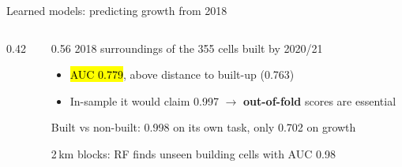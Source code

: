 \documentclass[aspectratio=169,11pt,t]{beamer}
\begin{document}
\begin{frame}{Learned models: predicting growth from 2018}
  \begin{columns}[T]
    \begin{column}{0.42\textwidth}
      \centering{}
    \end{column}
    \begin{column}{0.56\textwidth}
      \footnotesize
      2018 surroundings of the 355 cells built by 2020/21
      \begin{itemize}
        \item \hl{AUC 0.779}, above distance to built-up (0.763)
        \item In-sample it would claim 0.997 $\rightarrow$ \textbf{out-of-fold} scores are
              essential
      \end{itemize}
      Built vs non-built: 0.998 on its own task, only 0.702 on growth\par\vspace{3pt}
      2\,km blocks: RF finds unseen building cells with AUC 0.98\par\vspace{4pt}
      \hspace{0.5cm}%
    \end{column}
  \end{columns}
\end{frame}
\end{document}
